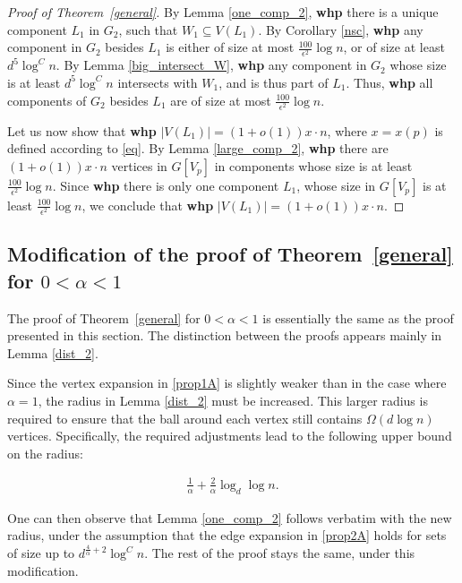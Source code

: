 \documentclass[notitlepage]{scrartcl}
\begin{document}
\begin{proof}[Proof of Theorem~\ref{general}]\label{finalproofgeneral}
    By Lemma \ref{one_comp_2}, \textbf{whp} there is a unique component $L_1$ in $G_2$, such that $W_1\subseteq V(L_1)$. By Corollary \ref{nsc}, \textbf{whp} any component in $G_2$ besides $L_1$ is either of size at most $\frac{100}{\epsilon^2}\log n$, or of size at least $d^5\log^C n$. By Lemma \ref{big_intersect_W}, \textbf{whp} any component in $G_2$ whose size is at least $d^5\log^C n$ intersects with $W_1$, and is thus part of $L_1$. Thus, \textbf{whp} all components of $G_2$ besides $L_1$ are of size at most $\frac{100}{\epsilon^2}\log n$.
    
    Let us now show that \textbf{whp} $|V(L_1)| = (1 + o(1))x\cdot n$, where $x = x(p)$ is defined according to \eqref{eq}. By Lemma \ref{large_comp_2}, \textbf{whp} there are $(1 + o(1))x\cdot n$ vertices in $G[V_p]$ in components whose size is at least $\frac{100}{\epsilon^2}\log n$. Since \textbf{whp} there is only one component $L_1$, whose size in $G[V_p]$ is at least $\frac{100}{\epsilon^2}\log n$, we
    conclude that \textbf{whp} $|V(L_1)| = (1 + o(1))x\cdot n$.
\end{proof}

\subsection{Modification of the proof of Theorem~\ref{general} for $0<\alpha<1$}\label{modi}

The proof of Theorem~\ref{general} for $0<\alpha<1$ is essentially the same as the proof presented in this section. The distinction between the proofs appears mainly in Lemma \ref{dist_2}.

Since the vertex expansion in \ref{prop1A} is slightly weaker than in the case where $\alpha=1$, the radius in Lemma \ref{dist_2} must be increased. This larger radius is required to ensure that the ball around each vertex still contains $\Omega\left(d\log n\right)$ vertices. Specifically, the required adjustments lead to the following upper bound on the radius:

\begin{align*}
    \frac{1}{\alpha}+\frac{2}{\alpha}\log_d\log n.
\end{align*}

One can then observe that Lemma \ref{one_comp_2} follows verbatim with the new radius, under the assumption that the edge expansion in \ref{prop2A} holds for sets of size up to $d^{\frac{4}{\alpha}+2}\log^C n$.
The rest of the proof stays the same, under this modification.
\end{document}

